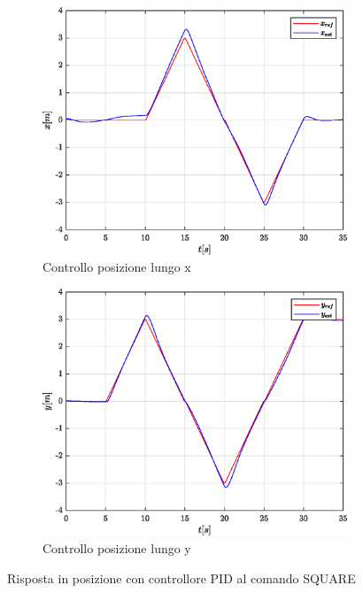 \begin{figure}
	\centering
	\begin{subfigure}{0.45\textwidth}
		\centering
		\includegraphics[width=1\textwidth]{Simulazioni/Figure/PID/SQUARE/PositionControlXPos}
		\caption{Controllo posizione lungo x}
		\label{fig:SQUAREerrposxPID}
	\end{subfigure}
	\hfill
	\begin{subfigure}{0.45\textwidth}
		\centering
		\includegraphics[width=1\textwidth]{Simulazioni/Figure/PID/SQUARE/PositionControlYPos}
		\caption{Controllo posizione lungo y}
		\label{fig:SQUAREerrposyPID}
	\end{subfigure}
	\caption{Risposta in posizione con controllore PID al comando SQUARE}
\end{figure}
